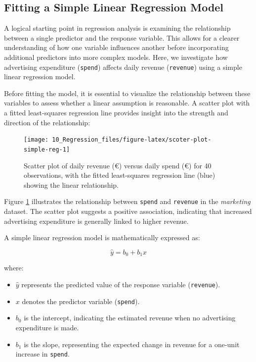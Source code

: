 \documentclass[
  11pt,
]{book}
\newcommand{\passthrough}[1]{#1}
\providecommand{\tightlist}{%
  \setlength{\itemsep}{0pt}\setlength{\parskip}{0pt}}
\theoremstyle{definition}
\theoremstyle{definition}
\theoremstyle{definition}
\theoremstyle{definition}
\theoremstyle{remark}
\begin{document}
\subsection*{Fitting a Simple Linear Regression Model}\label{fitting-a-simple-linear-regression-model}


A logical starting point in regression analysis is examining the relationship between a single predictor and the response variable. This allows for a clearer understanding of how one variable influences another before incorporating additional predictors into more complex models. Here, we investigate how advertising expenditure (\passthrough{\lstinline!spend!}) affects daily revenue (\passthrough{\lstinline!revenue!}) using a simple linear regression model.

Before fitting the model, it is essential to visualize the relationship between these variables to assess whether a linear assumption is reasonable. A scatter plot with a fitted least-squares regression line provides insight into the strength and direction of the relationship:

\begin{figure}[H]

{\centering \texttt{[image: 10\_Regression\_files/figure-latex/scoter-plot-simple-reg-1]} 

}

\caption{Scatter plot of daily revenue (€) versus daily spend (€) for 40 observations, with the fitted least-squares regression line (blue) showing the linear relationship.}\label{fig:scoter-plot-simple-reg}
\end{figure}

Figure \ref{fig:scoter-plot-simple-reg} illustrates the relationship between \passthrough{\lstinline!spend!} and \passthrough{\lstinline!revenue!} in the \emph{marketing} dataset. The scatter plot suggests a positive association, indicating that increased advertising expenditure is generally linked to higher revenue.

A simple linear regression model is mathematically expressed as:

\[
\hat{y} = b_0 + b_1x
\]

where:

\begin{itemize}
\tightlist
\item
  \(\hat{y}\) represents the predicted value of the response variable (\passthrough{\lstinline!revenue!}).\\
\item
  \(x\) denotes the predictor variable (\passthrough{\lstinline!spend!}).\\
\item
  \(b_0\) is the intercept, indicating the estimated revenue when no advertising expenditure is made.\\
\item
  \(b_1\) is the slope, representing the expected change in revenue for a one-unit increase in \passthrough{\lstinline!spend!}.
\end{itemize}
\end{document}
